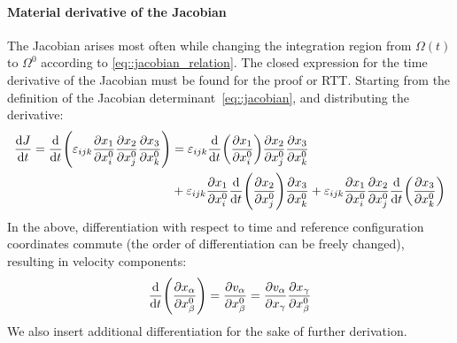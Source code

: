 \documentclass{article}
\providecommand{\levicivita}[3]{%
  \ensuremath{\varepsilon_{{#1}{#2}{#3}}}
}
\begin{document}
\paragraph{Material derivative of the Jacobian}
The Jacobian arises most often while changing the integration region 
from \(\Omega(t)\) to \(\Omega^0\) according to \autoref{eq::jacobian_relation}.
The closed expression for the time derivative of the Jacobian must be found 
for the proof or RTT.
Starting from the definition of the Jacobian determinant~\autoref{eq::jacobian},
and distributing the derivative:
\begin{align*}
  \dv{J}{t} = \dv{t} \qty(\levicivita{i}{j}{k} 
  \pdv{x_1}{x^0_i} \pdv{x_2}{x^0_j} \pdv{x_3}{x^0_k})
  &= \levicivita{i}{j}{k} \dv{t} \qty( \pdv{x_1}{x^0_i} ) 
    \pdv{x_2}{x^0_j} \pdv{x_3}{x^0_k} \\
  &+ \levicivita{i}{j}{k} \pdv{x_1}{x^0_i} 
    \dv{t} \qty( \pdv{x_2}{x^0_j})  \pdv{x_3}{x^0_k} 
  + \levicivita{i}{j}{k} \pdv{x_1}{x^0_i} 
    \pdv{x_2}{x^0_j} \dv{t} \qty( \pdv{x_3}{x^0_k} )  
\end{align*}
In the above, differentiation with respect to time and reference
configuration coordinates commute (the order of differentiation 
can be freely changed), resulting in velocity components:
\begin{equation*}
  \dv{t} \qty( \pdv{x_\alpha}{x^0_\beta} )
  = \pdv{v_\alpha}{x^0_\beta}
  = \pdv{v_\alpha}{x_\gamma} \pdv{x_\gamma}{x^0_\beta}
\end{equation*}
We also insert additional differentiation for the sake of 
further derivation.
\end{document}
